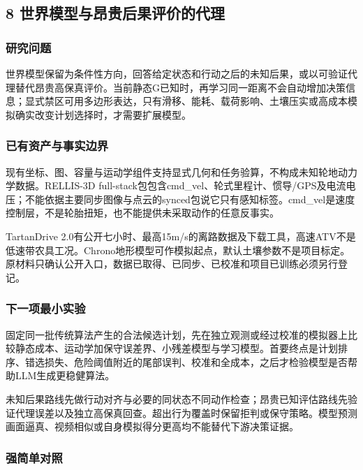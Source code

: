 \documentclass[11pt,a4paper]{article}
\newcommand{\bodytext}[1]{#1\par}
\begin{document}
\subsection{8  世界模型与昂贵后果评价的代理}
\subsubsection{研究问题}
\bodytext{世界模型保留为条件性方向，回答给定状态和行动之后的未知后果，或以可验证代理替代昂贵高保真评价。当前静态G已知时，再学习同一距离不会自动增加决策信息；显式禁区可用多边形表达，只有滑移、能耗、载荷影响、土壤压实或高成本模拟确实改变计划选择时，才需要扩展模型。}
\subsubsection{已有资产与事实边界}
\bodytext{现有坐标、图、容量与运动学组件支持显式几何和任务验算，不构成未知轮地动力学数据。RELLIS-3D full-stack包包含cmd\_\allowbreak{}vel、轮式里程计、惯导/\allowbreak{}GPS及电流电压；不能依据主要同步图像与点云的synced包说它只有感知标签。cmd\_\allowbreak{}vel是速度控制层，不是轮胎扭矩，也不能提供未采取动作的任意反事实。}
\bodytext{TartanDrive 2.0有公开七小时、最高15m/\allowbreak{}s的离路数据及下载工具，高速ATV不是低速带农具工况。Chrono地形模型可作模拟起点，默认土壤参数不是项目标定。原材料只确认公开入口，数据已取得、已同步、已校准和项目已训练必须另行登记。}
\subsubsection{下一项最小实验}
\bodytext{固定同一批传统算法产生的合法候选计划，先在独立观测或经过校准的模拟器上比较静态成本、运动学加保守误差界、小残差模型与学习模型。首要终点是计划排序、错选损失、危险阈值附近的尾部误判、校准和全成本，之后才检验模型是否帮助LLM生成更稳健算法。}
\bodytext{未知后果路线先做行动对齐与必要的同状态不同动作检查；昂贵已知评估路线先验证代理误差以及独立高保真回查。超出行为覆盖时保留拒判或保守策略。模型预测画面逼真、视频相似或自身模拟得分更高均不能替代下游决策证据。}
\subsubsection{强简单对照}
\end{document}
